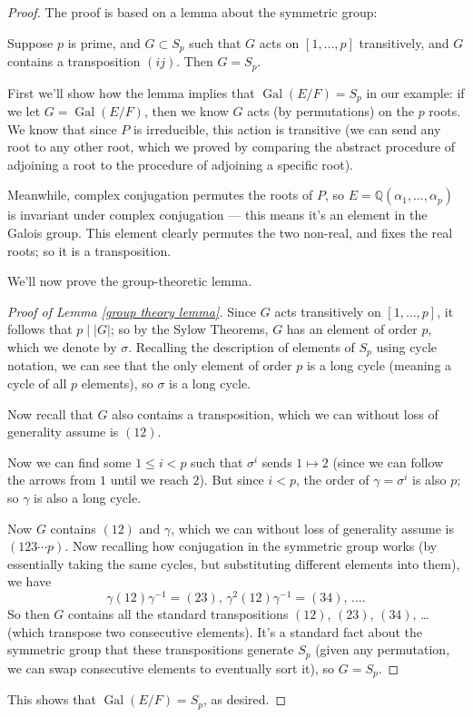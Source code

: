 \begin{proof}
    The proof is based on a lemma about the symmetric group:

    \begin{lemma} \label{group theory lemma}
        Suppose $p$ is prime, and $G \subset S_p$ such that $G$ acts on $[1, \ldots, p]$ transitively, and $G$ contains a transposition $(ij)$. Then $G = S_p$. 
    \end{lemma}
    
    First we'll show how the lemma implies that $\operatorname{Gal}(E/F) = S_p$ in our example: if we let $G = \operatorname{Gal}(E/F)$, then we know $G$ acts (by permutations) on the $p$ roots. We know that since $P$ is irreducible, this action is transitive (we can send any root to any other root, which we proved by comparing the abstract procedure of adjoining a root to the procedure of adjoining a specific root). 
    
    Meanwhile, complex conjugation permutes the roots of $P$, so $E = \mathbb{Q}(\alpha_1, \ldots, \alpha_p)$ is invariant under complex conjugation --- this means it's an element in the Galois group. This element clearly permutes the two non-real, and fixes the real roots; so it is a transposition. 
    
    We'll now prove the group-theoretic lemma. 

    \begin{proof}[Proof of Lemma \ref{group theory lemma}]
        Since $G$ acts transitively on $[1, \ldots, p]$, it follows that $p \mid \lvert G\rvert$; so by the Sylow Theorems, $G$ has an element of order $p$, which we denote by $\sigma$. Recalling the description of elements of $S_p$ using cycle notation, we can see that the only element of order $p$ is a long cycle (meaning a cycle of all $p$ elements), so $\sigma$ is a long cycle. 

        Now recall that $G$ also contains a transposition, which we can without loss of generality assume is $(12)$. 

        Now we can find some $1 \leq i < p$ such that $\sigma^i$ sends $1 \mapsto 2$ (since we can follow the arrows from $1$ until we reach $2$). But since $i < p$, the order of $\gamma = \sigma^i$ is also $p$; so $\gamma$ is also a long cycle. 
        
        Now $G$ contains $(12)$ and $\gamma$, which we can without loss of generality assume is $(123\cdots p)$. Now recalling how conjugation in the symmetric group works (by essentially taking the same cycles, but substituting different elements into them), we have \[\gamma (12) \gamma^{-1} = (23), \, \gamma^2(12)\gamma^{-1} = (34), \, \ldots.\] So then $G$ contains all the standard transpositions $(12)$, $(23)$, $(34)$, \ldots (which transpose two consecutive elements). It's a standard fact about the symmetric group that these transpositions generate $S_p$ (given any permutation, we can swap consecutive elements to eventually sort it), so $G = S_p$.
    \end{proof}

    This shows that $\operatorname{Gal}(E/F) = S_p$, as desired. 
\end{proof}

